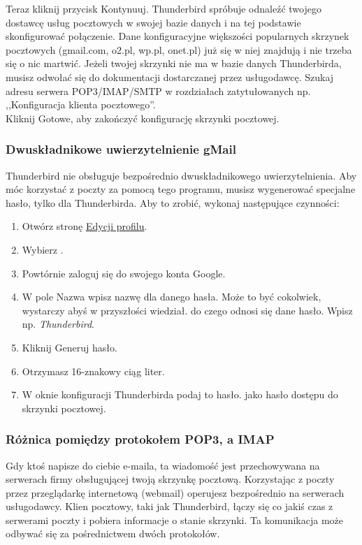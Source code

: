 Teraz kliknij przycisk \textcolor{ubuntu_orange}{Kontynuuj}. Thunderbird spróbuje odnaleźć twojego dostawcę usług pocztowych w swojej bazie danych i na tej podstawie skonfigurować połączenie. Dane konfiguracyjne większości popularnych skrzynek pocztowych (gmail.com, o2.pl, wp.pl, onet.pl) już się w niej znajdują i nie trzeba się o nic martwić. Jeżeli twojej skrzynki nie ma w bazie danych Thunderbirda, musisz odwołać się do dokumentacji dostarczanej przez usługodawcę. Szukaj adresu serwera POP3/IMAP/SMTP w rozdziałach zatytułowanych np. ,,Konfiguracja klienta pocztowego''.\\
Kliknij \textcolor{ubuntu_orange}{Gotowe}, aby zakończyć konfigurację skrzynki pocztowej.

\subsubsection{Dwuskładnikowe uwierzytelnienie gMail}
Thunderbird nie obsługuje bezpośrednio dwuskładnikowego uwierzytelnienia. Aby móc korzystać z poczty za pomocą tego programu, musisz wygenerować specjalne hasło, tylko dla Thunderbirda. Aby to zrobić, wykonaj następujące czynności:
\begin{enumerate}
\item Otwórz stronę \href{https://www.google.com/settings/personalinfo}{Edycji profilu}.
\item Wybierz .
\item Powtórnie zaloguj się do swojego konta Google.
\item W pole \textcolor{ubuntu_orange}{Nazwa} wpisz nazwę dla danego hasła. Może to być cokolwiek, wystarczy abyś w przyszłości wiedział. do czego odnosi się dane hasło. Wpisz np. \textit{Thunderbird}.
\item Kliknij \textcolor{ubuntu_orange}{Generuj hasło}.
\item Otrzymasz 16-znakowy ciąg liter. 
\item W oknie konfiguracji Thunderbirda podaj to hasło. jako hasło dostępu do skrzynki pocztowej.
\end{enumerate}

\subsubsection{Różnica pomiędzy protokołem POP3, a IMAP}
Gdy ktoś napisze do ciebie e-maila, ta wiadomość jest przechowywana na serwerach firmy obsługującej twoją skrzynkę pocztową. Korzystając z poczty przez przeglądarkę internetową (webmail) operujesz bezpośrednio na serwerach usługodawcy. Klien pocztowy, taki jak Thunderbird, łączy się co jakiś czas z serwerami poczty i pobiera informacje o stanie skrzynki. Ta komunikacja może odbywać się za pośrednictwem dwóch protokołów.

